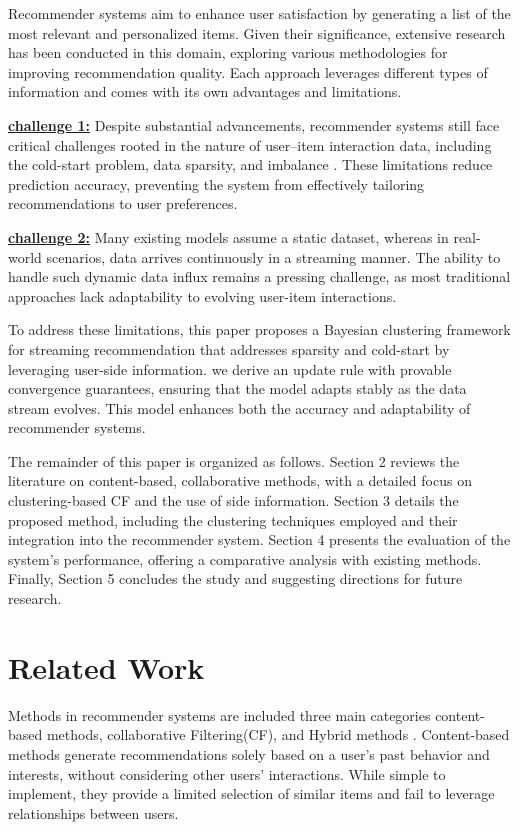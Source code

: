 \documentclass{article}
\begin{document}
Recommender systems aim to enhance user satisfaction by generating a list of the most relevant and personalized items. Given their significance, extensive research has been conducted in this domain, exploring various methodologies for improving recommendation quality. Each approach leverages different types of information and comes with its own advantages and limitations.  

\underline {\textbf{challenge 1:}}
Despite substantial advancements, recommender systems still face critical challenges rooted in the nature of user–item interaction data, including the cold-start problem, data sparsity, and imbalance \cite{li2024recent, rama2019deep}. These limitations reduce prediction accuracy, preventing the system from effectively tailoring recommendations to user preferences.

\underline{\textbf{challenge 2:}}
 Many existing models assume a static dataset, whereas in real-world scenarios, data arrives continuously in a streaming manner. The ability to handle such dynamic data influx remains a pressing challenge, as most traditional approaches lack adaptability to evolving user-item interactions.  

To address these limitations, this paper proposes a Bayesian clustering framework for streaming recommendation that addresses sparsity and cold-start by leveraging user-side information. we derive an update rule with provable convergence guarantees, ensuring that the model adapts stably as the data stream evolves. This model enhances both the accuracy and adaptability of recommender systems.

The remainder of this paper is organized as follows. Section 2 reviews the literature on content-based, collaborative methods, with a detailed focus on clustering-based CF and the use of side information. Section 3 details the proposed method, including the clustering techniques employed and their integration into the recommender system. Section 4 presents the evaluation of the system’s performance, offering a comparative analysis with existing methods. Finally, Section 5 concludes the study and suggesting directions for future research.

\section{Related Work}
Methods in recommender systems are included three main categories content-based methods, collaborative Filtering(CF), and Hybrid methods \cite{aljunid2025collaborative}. Content-based methods generate recommendations solely based on a user's past behavior and interests, without considering other users' interactions. While simple to implement, they provide a limited selection of similar items and fail to leverage relationships between users. 
\end{document}

